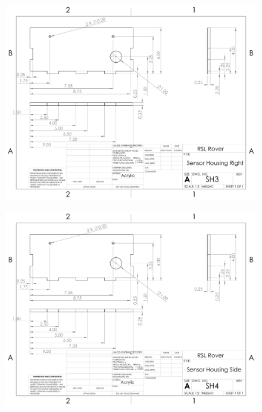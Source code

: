 \begin{figure}[H]
	\centerline{\includegraphics[angle=90,width=1.0\linewidth]{dwgs/SH3.pdf}}
\end{figure}

\begin{figure}[H]
	\centerline{\includegraphics[angle=90,width=1.0\linewidth]{dwgs/SH4.pdf}}
\end{figure}

